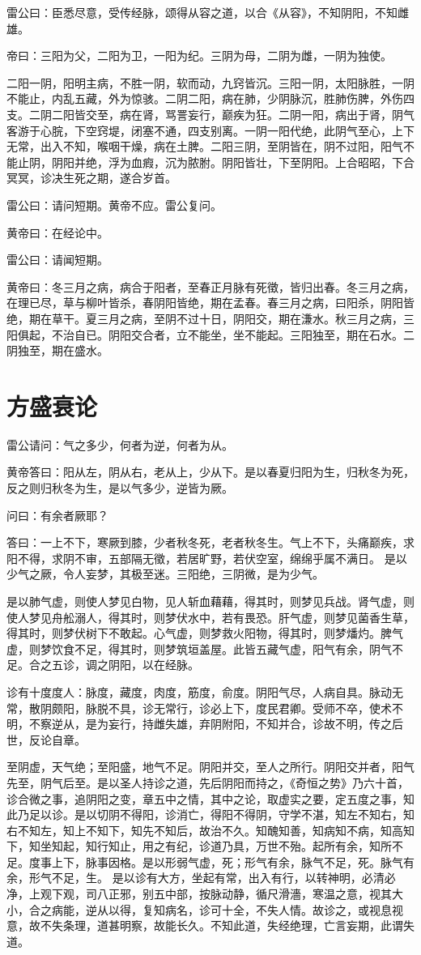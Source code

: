\documentclass{article}%
\begin{document}
雷公曰：臣悉尽意，受传经脉，颂得从容之道，以合《从容》，不知阴阳，不知雌雄。

帝曰：三阳为父，二阳为卫，一阳为纪。三阴为母，二阴为雌，一阴为独使。

二阳一阴，阳明主病，不胜一阴，软而动，九窍皆沉。三阳一阴，太阳脉胜，一阴不能止，内乱五藏，外为惊骇。二阴二阳，病在肺，少阴脉沉，胜肺伤脾，外伤四支。二阴二阳皆交至，病在肾，骂詈妄行，巅疾为狂。二阴一阳，病出于肾，阴气客游于心脘，下空窍堤，闭塞不通，四支别离。一阴一阳代绝，此阴气至心，上下无常，出入不知，喉咽干燥，病在土脾。二阳三阴，至阴皆在，阴不过阳，阳气不能止阴，阴阳并绝，浮为血瘕，沉为脓胕。阴阳皆壮，下至阴阳。上合昭昭，下合冥冥，诊决生死之期，遂合岁首。

雷公曰：请问短期。黄帝不应。雷公复问。

黄帝曰：在经论中。

雷公曰：请闻短期。

黄帝曰：冬三月之病，病合于阳者，至春正月脉有死徵，皆归出春。冬三月之病，在理已尽，草与柳叶皆杀，春阴阳皆绝，期在孟春。春三月之病，曰阳杀，阴阳皆绝，期在草干。夏三月之病，至阴不过十日，阴阳交，期在溓水。秋三月之病，三阳俱起，不治自已。阴阳交合者，立不能坐，坐不能起。三阳独至，期在石水。二阴独至，期在盛水。
\section{方盛衰论}
雷公请问：气之多少，何者为逆，何者为从。

黄帝答曰：阳从左，阴从右，老从上，少从下。是以春夏归阳为生，归秋冬为死，反之则归秋冬为生，是以气多少，逆皆为厥。

问曰：有余者厥耶？

答曰：一上不下，寒厥到膝，少者秋冬死，老者秋冬生。气上不下，头痛巅疾，求阳不得，求阴不审，五部隔无徵，若居旷野，若伏空室，绵绵乎属不满日。 是以少气之厥，令人妄梦，其极至迷。三阳绝，三阴微，是为少气。

是以肺气虚，则使人梦见白物，见人斩血藉藉，得其时，则梦见兵战。肾气虚，则使人梦见舟舩溺人，得其时，则梦伏水中，若有畏恐。肝气虚，则梦见菌香生草，得其时，则梦伏树下不敢起。心气虚，则梦救火阳物，得其时，则梦燔灼。脾气虚，则梦饮食不足，得其时，则梦筑垣盖屋。此皆五藏气虚，阳气有余，阴气不足。合之五诊，调之阴阳，以在经脉。

诊有十度度人：脉度，藏度，肉度，筋度，俞度。阴阳气尽，人病自具。脉动无常，散阴颇阳，脉脱不具，诊无常行，诊必上下，度民君卿。受师不卒，使术不明，不察逆从，是为妄行，持雌失雄，弃阴附阳，不知并合，诊故不明，传之后世，反论自章。

至阴虚，天气绝；至阳盛，地气不足。阴阳并交，至人之所行。阴阳交并者，阳气先至，阴气后至。是以圣人持诊之道，先后阴阳而持之，《奇恒之势》乃六十首，诊合微之事，追阴阳之变，章五中之情，其中之论，取虚实之要，定五度之事，知此乃足以诊。是以切阴不得阳，诊消亡，得阳不得阴，守学不湛，知左不知右，知右不知左，知上不知下，知先不知后，故治不久。知醜知善，知病知不病，知高知下，知坐知起，知行知止，用之有纪，诊道乃具，万世不殆。起所有余，知所不足。度事上下，脉事因格。是以形弱气虚，死；形气有余，脉气不足，死。脉气有余，形气不足，生。 是以诊有大方，坐起有常，出入有行，以转神明，必清必净，上观下观，司八正邪，别五中部，按脉动静，循尺滑濇，寒温之意，视其大小，合之病能，逆从以得，复知病名，诊可十全，不失人情。故诊之，或视息视意，故不失条理，道甚明察，故能长久。不知此道，失经绝理，亡言妄期，此谓失道。
\end{document}
